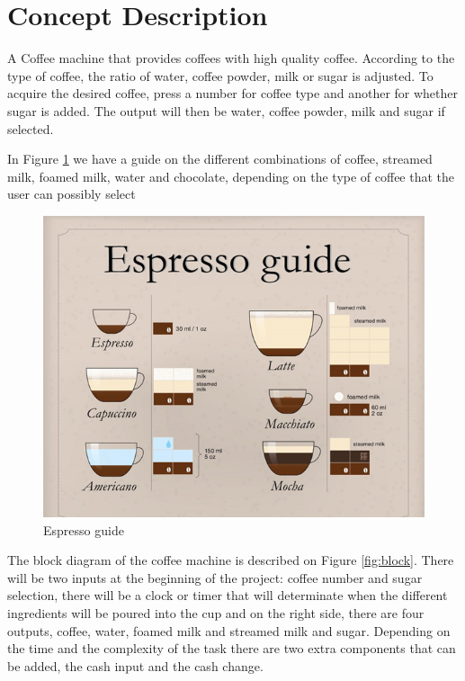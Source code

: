 \documentclass[12pt]{article}
\begin{document}
\section{Concept Description}

A Coffee machine that provides coffees with high quality coffee. According to the type of coffee, the ratio of water, coffee powder, milk or sugar is adjusted. To acquire the desired coffee, press a number for coffee type and another for whether sugar is added. The output will then be water, coffee powder, milk and sugar if selected.

In Figure \ref{fig:espresso} we have a guide on the different combinations of coffee, streamed milk, foamed milk, water and chocolate, depending on the type of coffee that the user can possibly select

\begin{figure}[!h]
\includegraphics[scale=0.83]{imgs/expesoguide.png}
\caption{Espresso guide}
\label{fig:espresso}
\end{figure}

The block diagram of the coffee machine is described on Figure \ref{fig:block}. There will be two inputs at the beginning of the project: coffee number and sugar selection, there will be a clock or timer that will determinate when the different ingredients will be poured into the cup and on the right side, there are four outputs, coffee, water, foamed milk and streamed milk and sugar. Depending on the time and the complexity of the task there are two extra components that can be added, the cash input and the cash change.
\end{document}
